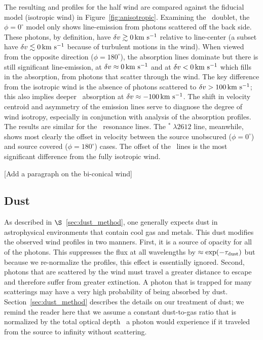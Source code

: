 \documentclass[12pt,preprint]{aastex}
\begin{document}
The resulting  and
 profiles for the half wind are compared against the fiducial model
(isotropic wind) in Figure~\ref{fig:anisotropic}.  
Examining the \mgiid\ doublet, 
the $\phi = 0^\circ$ model only shows
line-emission from photons scattered
off the back side.  These photons, by definition, have $\delta v \gtrsim 0 \, {\rm km~s^{-1}}$
relative to line-center (a subset have $\delta v \lesssim 0 \, {\rm km~s^{-1}}$ because
of turbulent motions in the wind). 
When viewed from the opposite direction ($\phi = 180^\circ$), the
absorption lines dominate but there is still significant
line-emission, at $\delta v \approx 0 \, {\rm km~s^{-1}}$ and at $\delta v < 0 \, {\rm km~s^{-1}}$ which fills
in the absorption, from photons that scatter through the wind.  The
key difference from the isotropic wind is the absence of photons
scattered to $\delta v > 100 \, {\rm km~s^{-1}}$;  this also implies deeper 
\mgiib\ absorption at $\delta v \approx -100 \, {\rm km~s^{-1}}$. The 
shift in velocity centroid and asymmetry of the emission lines
serve to diagnose the degree of wind isotropy, especially in
conjunction with analysis of the absorption profiles. 
The results are similar for the \feiid\ resonance lines.  The
$^* \; \lambda 2612$ line, meanwhile, shows most clearly the
offset in velocity between the source unobscured ($\phi = 0^\circ$)
and source covered ($\phi = 180^\circ$) cases.  The offset of the
\feiis\ lines is the most significant 
difference from the fully isotropic wind.

[Add a paragraph on the bi-conical wind]

\subsection{Dust}
\label{sec:dust}

As described in $\S$~\ref{sec:dust_method}, 
one generally expects dust in astrophysical environments that contain
cool gas and metals.  This dust 
modifies the observed wind profiles in two manners. 
First, it is a source of opacity for all of 
the photons.  This suppresses the flux at all
wavelengths by $\approx \exp(-\tau_{\rm dust})$ but because we re-normalize the
profiles, this effect is essentially ignored.  Second, photons that are
scattered by the wind must travel a greater
distance to escape and therefore suffer from greater extinction.  A photon that is
trapped for many scatterings may have a very high probability of being absorbed
by dust.  
Section~\ref{sec:dust_method} describes the details on our treatment of dust; we 
remind the reader here that we assume a constant dust-to-gas ratio 
that is normalized by the total optical
depth \taud\ a photon would experience if it traveled from the
source to infinity without scattering. 
\end{document}
